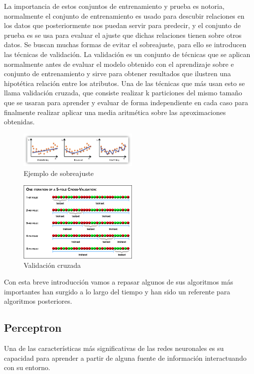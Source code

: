 \documentclass[a4paper, 11pt]{article} %
\begin{document}
La importancia de estos conjuntos de entrenamiento y prueba es notoria, normalmente el conjunto de entrenamiento es usado para descubir relaciones en los datos que posteriormente nos puedan servir para predecir, y el conjunto de prueba es se usa para evaluar el ajuste que dichas relaciones tienen sobre otros datos. Se buscan muchas formas de evitar el sobreajuste, para ello se introducen las técnicas de validación. La validación es un conjunto de técnicas que se aplican normalmente antes de evaluar el modelo obtenido con el aprendizaje sobre e conjunto de entrenamiento y sirve para obtener resultados que ilustren una hipotética relación entre los atributos. Una de las técnicas que más usan esto se llama validación cruzada, que consiste realizar k particiones del mismo tamaño que se usaran para aprender y evaluar de forma independiente en cada caso para finalmente realizar aplicar una media aritmética sobre las aproximaciones obtenidas.
\begin{figure}[H]
\centering
\includegraphics[width=0.52\textwidth]{overfitting}
\caption{Ejemplo de sobreajuste}
\label{Ejemplo de sobreajuste}
\end{figure}
\begin{figure}[H]
\centering
\includegraphics[width=0.52\textwidth]{xv_folds}
\caption{Validación cruzada}
\label{Validación cruzada}
\end{figure}
Con esta breve introducción vamos a repasar algunos de sus algoritmos más importantes han surgido a lo largo del tiempo y han sido un referente para algoritmos posteriores.

\subsection{Perceptron}
Una de las características más significativas de las redes neuronales es su capacidad para aprender a partir de alguna fuente de información interactuando con su entorno.
\end{document}
